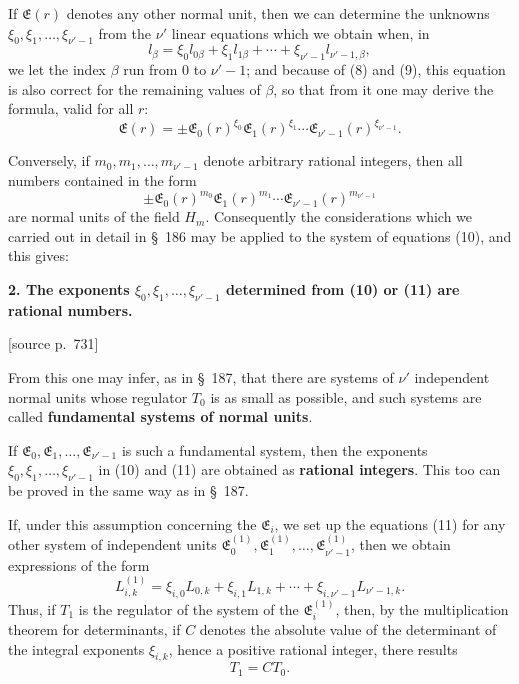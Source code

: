 \documentclass[11pt]{article}
\newcommand{\srcpage}[1]{\par\medskip\noindent\textsf{[source p.~#1]}\par\smallskip}
\begin{document}
If $\mathfrak E(r)$ denotes any other normal unit, then we can determine the unknowns $\xi_0,\xi_1,\ldots,\xi_{\nu'-1}$ from the $\nu'$ linear equations which we obtain when, in
\begin{equation}
l_\beta=\xi_0l_{0\beta}+\xi_1l_{1\beta}+\cdots+\xi_{\nu'-1}l_{\nu'-1,\beta},
\tag{11}
\end{equation}
we let the index $\beta$ run from $0$ to $\nu'-1$; and because of (8) and (9), this equation is also correct for the remaining values of $\beta$, so that from it one may derive the formula, valid for all $r$:
\begin{equation}
\mathfrak E(r)=\pm\mathfrak E_0(r)^{\xi_0}\mathfrak E_1(r)^{\xi_1}\cdots\mathfrak E_{\nu'-1}(r)^{\xi_{\nu'-1}}.
\tag{12}
\end{equation}

Conversely, if $m_0,m_1,\ldots,m_{\nu'-1}$ denote arbitrary rational integers, then all numbers contained in the form
\[
\pm\mathfrak E_0(r)^{m_0}\mathfrak E_1(r)^{m_1}\cdots\mathfrak E_{\nu'-1}(r)^{m_{\nu'-1}}
\]
are normal units of the field $H_m$. Consequently the considerations which we carried out in detail in \S~186 may be applied to the system of equations (10), and this gives:

\begin{center}\textbf{2. The exponents $\xi_0,\xi_1,\ldots,\xi_{\nu'-1}$ determined from (10) or (11) are rational numbers.}\end{center}

\srcpage{731}
From this one may infer, as in \S~187, that there are systems of $\nu'$ independent normal units whose regulator $T_0$ is as small as possible, and such systems are called \textbf{fundamental systems of normal units}.

If $\mathfrak E_0,\mathfrak E_1,\ldots,\mathfrak E_{\nu'-1}$ is such a fundamental system, then the exponents $\xi_0,\xi_1,\ldots,\xi_{\nu'-1}$ in (10) and (11) are obtained as \textbf{rational integers}. This too can be proved in the same way as in \S~187.

If, under this assumption concerning the $\mathfrak E_i$, we set up the equations (11) for any other system of independent units $\mathfrak E_0^{(1)},\mathfrak E_1^{(1)},\ldots,\mathfrak E_{\nu'-1}^{(1)}$, then we obtain expressions of the form
\[
L_{i,k}^{(1)}=\xi_{i,0}L_{0,k}+\xi_{i,1}L_{1,k}+\cdots+\xi_{i,\nu'-1}L_{\nu'-1,k}.
\]
Thus, if $T_1$ is the regulator of the system of the $\mathfrak E_i^{(1)}$, then, by the multiplication theorem for determinants, if $C$ denotes the absolute value of the determinant of the integral exponents $\xi_{i,k}$, hence a positive rational integer, there results
\begin{equation}
T_1=CT_0.
\tag{13}
\end{equation}
\end{document}
